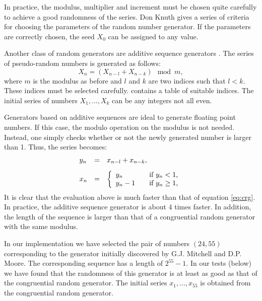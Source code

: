 In practice, the modulus, multiplier and increment must be chosen
quite carefully to achieve a good randomness of the series. Don
Knuth \cite{Knuth2} gives a series of criteria for choosing the
parameters of the random number generator. If the parameters are
correctly chosen, the seed $X_0$ can be assigned to any value.

 Another class of random
generators are additive sequence generators \cite{Knuth2}. The
series of pseudo-random numbers is generated as follows:
\begin{equation}
  X_n = \left(X_{n-l}+X_{n-k}\right) \mod m,
\end{equation}
where $m$ is the modulus as before and $l$ and $k$ are two indices
such that $l<k$. These indices must be selected carefully.
\cite{Knuth2} contains a table of suitable indices. The initial
series of numbers $X_1,\ldots,X_k$ can be any integers not all
even.

Generators based on additive sequences are ideal to generate
floating point numbers. If this case, the modulo operation on the
modulus is not needed. Instead, one simply checks whether or not
the newly generated number is larger than 1. Thus, the series
becomes:
\begin{equation}
\label{eq:addseqrandom}
  \begin{array}{lcl}
  y_n&=&x_{n-l}+x_{n-k},\\*[2ex]
  x_n&=&\left\{
    \begin{array}{ll}
    y_n&\mbox{\quad if $y_n<1$,}\\
    y_n-1&\mbox{\quad if $y_n\geq 1$,}\\
    \end{array}
  \right.
  \end{array}
\end{equation}
It is clear that the evaluation above is much faster than that of
equation \ref{eq:crg}. In practice, the additive sequence
generator is about 4 times faster. In addition, the length of the
sequence is larger than that of a  congruential random generator
with the same modulus.

In our implementation we have selected the pair of numbers
$\left(24,55\right)$ corresponding to the generator initially
discovered by G.J. Mitchell and D.P. Moore\cite{Knuth2}. The
corresponding sequence has a length of $2^{55}-1$. In our tests
(\cf below) we have found that the randomness of this generator is
at least as good as that of the congruential random generator. The
initial series $x_1,\ldots,x_{55}$ is obtained from the
congruential random generator.

